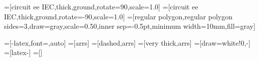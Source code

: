 

 =[circuit ee IEC,thick,ground,rotate=90,scale=1.0]
 =[circuit ee IEC,thick,ground,rotate=-90,scale=1.0]
 =[regular polygon,regular polygon sides=3,draw=gray,scale=0.50,inner sep=-0.5pt,minimum width=10mm,fill=gray]


=[-latex,font=\small,auto]
=[arrs]
=[dashed,arrs]
=[very thick,arrs]
=[draw=white!0,-]
=[latex-]
=[]
